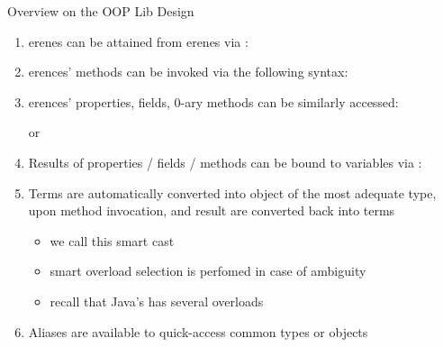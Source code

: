 \documentclass[handout]{beamer}
\begin{document}
\begin{frame}[allowframebreaks]{Overview on the OOP Lib Design}
\begin{enumerate}
        \bigskip

        \item {}erenes can be attained from erenes via :

        \framebreak

        \item {}erences' methods can be invoked via the following syntax:
        \begin{center}
        \end{center}

        \smallskip

        \item {}erences' properties, fields, 0-ary methods can be similarly accessed:
        \begin{center}
             \quad or \quad {}
        \end{center}

        \smallskip

        \item Results of properties / fields / methods can be bound to variables via :

        \framebreak

        \item Terms are automatically converted into object of the \alert{most adequate} type, upon method invocation, and result are converted back into terms
        \begin{itemize}
            \item we call this \alert{smart cast}
            \item smart \alert{overload selection} is perfomed in case of ambiguity
        \end{itemize}
        \begin{itemize}\small
            \item recall that Java's  has several overloads
        \end{itemize}

        \framebreak

        \item \alert{Aliases} are available to quick-access common types or objects


\end{enumerate}
\end{frame}
\end{document}
